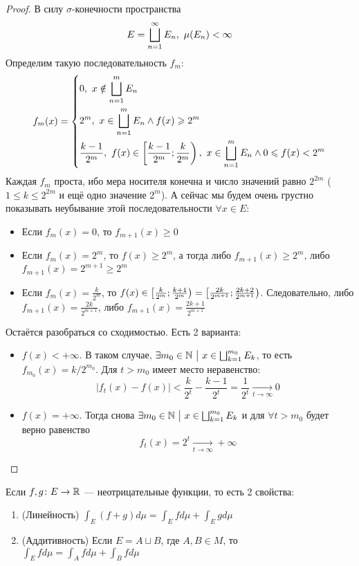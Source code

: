 \begin{proof}
	В силу $\sigma$-конечности пространства
	\[
		E = \bigsqcup_{n = 1}^\infty E_n,\ \mu(E_n) < \infty
	\]
	Определим такую последовательность $f_m$:
	\[
		f_m(x) = \left\{\begin{aligned}
			&{0,\ x \notin \bigsqcup_{n = 1}^m E_n}
			\\
			&{2^m,\ x \in \bigsqcup_{n = 1}^m E_n \wedge f(x) \geqslant 2^m}
			\\
			&{\frac{k - 1}{2^m},\ f(x) \in \left[\frac{k - 1}{2^m}; \frac{k}{2^m}\right),\ x \in \bigsqcup_{n = 1}^m E_n \wedge 0 \leqslant f(x) < 2^m}
		\end{aligned}\right.
	\]
	Каждая $f_m$ проста, ибо мера носителя конечна и число значений равно $2^{2m}$ ($1 \le k \le 2^{2m}$ и ещё одно значение $2^m$). А сейчас мы будем очень грустно показывать неубывание этой последовательности $\forall x \in E$:
	\begin{itemize}
		\item Если $f_m(x) = 0$, то $f_{m + 1}(x) \ge 0$
		
		\item Если $f_m(x) = 2^m$, то $f(x) \ge 2^m$, а тогда либо $f_{m + 1}(x) \ge 2^m$, либо $f_{m + 1}(x) = 2^{m + 1} \ge 2^m$
		
		\item Если $f_m(x) = \frac{k}{2^m}$, то $f(x) \in \left[\frac{k}{2^m}; \frac{k + 1}{2^m}\right) = \left[\frac{2k}{2^{m + 1}}; \frac{2k + 2}{2^{m + 1}}\right)$. Следовательно, либо $f_{m + 1}(x) = \frac{2k}{2^{m + 1}}$, либо $f_{m + 1}(x) = \frac{2k + 1}{2^{m + 1}}$
	\end{itemize}
	Остаётся разобраться со сходимостью. Есть 2 варианта:
	\begin{itemize}
		\item $f(x) < +\infty$. В таком случае, $\exists m_0 \in \mathbb{N} \ \big|\  x \in \bigsqcup_{k = 1}^{m_0} E_k$, то есть $f_{m_0}(x) = k / 2^{m_0}$. Для $t > m_0$ имеет место неравенство:
		\[
			|f_t(x) - f(x)| < \frac{k}{2^t} - \frac{k - 1}{2^{t}} = \frac{1}{2^t} \xrightarrow[t \to \infty]{} 0
		\]
		
		\item $f(x) = +\infty$. Тогда снова $\exists m_0 \in \mathbb{N} \ \big|\  x \in \bigsqcup_{k = 1}^{m_0} E_k$ и для $\forall t > m_0$ будет верно равенство
		\[
			f_t(x) = 2^t \xrightarrow[t \to \infty]{} +\infty
		\]
	\end{itemize}
\end{proof}

\begin{theorem}
	Если $f, g \colon E \to \mathbb{R}$ --- неотрицательные функции, то есть 2 свойства:
	\begin{enumerate}
		\item (Линейность) \(\int_E (f + g)d\mu = \int_E fd\mu + \int_E gd\mu\)
		
		\item (Аддитивность) Если $E = A \sqcup B$, где $A, B \in M$, то \(\int_E fd\mu = \int_A fd\mu + \int_B fd\mu\)
	\end{enumerate}
\end{theorem}

